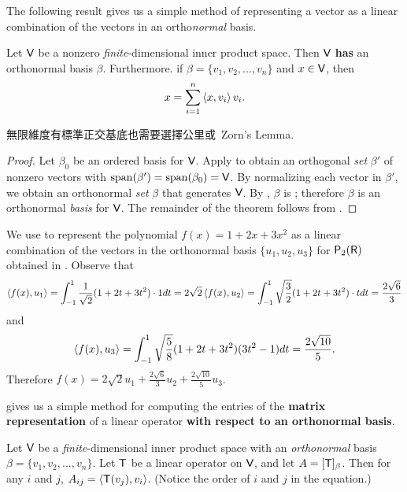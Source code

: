 The following result gives us a simple method of representing a vector as a linear combination of the vectors in an ortho\emph{normal} basis.

\begin{theorem} \label{thm 6.5}
Let \(\textsf{V}\) be a nonzero \emph{finite}-dimensional inner product space.
Then \(\textsf{V}\) \textbf{has} an orthonormal basis \(\beta\).
Furthermore. if \(\beta = \{ v_1, v_2, ..., v_n \}\) and \(x \in \textsf{V}\), then
\[
    x = \sum_{i = 1}^n \left< x, v_i \right> v_i.
\]
\end{theorem}

\begin{note}
無限維度有標準正交基底也需要選擇公里或\ Zorn's Lemma.
\end{note}

\begin{proof}
Let \(\beta_0\) be an ordered basis for \(\textsf{V}\).
Apply  to obtain an orthogonal \emph{set} \(\beta'\) of nonzero vectors with \(\operatorname{span}(\beta') = \operatorname{span}(\beta_0) = \textsf{V}\).
By normalizing each vector in \(\beta'\), we obtain an orthonormal \emph{set} \(\beta\) that generates \(\textsf{V}\).
By , \(\beta\) is \LID{}; therefore \(\beta\) is an orthonormal \emph{basis} for \(\textsf{V}\).
The remainder of the theorem follows from .
\end{proof}

\begin{example} \label{example 6.2.6}
We use  to represent the polynomial \(f(x) = 1 + 2x + 3x^2\) as a linear combination of the vectors in the orthonormal basis \(\{ u_1, u_2, u_3 \}\) for \(\textsf{P}_2(\textsf{R})\) obtained in .
Observe that
\[
    \left< f(x), u_1 \right> = \int_{-1}^{1} \frac{1}{\sqrt{2}} (1+2 t+3 t^2) \cdot 1 dt = 2 \sqrt{2} \\
    \left< f(x), u_2 \right> = \int_{-1}^{1} \sqrt{\frac{3}{2}} (1+2 t+3 t^2) \cdot t dt = \frac{2 \sqrt{6}}{3}
\]
and
\[
    \left< f(x), u_3 \right> = \int_{-1}^{1} \sqrt{\frac{5}{8}} (1 + 2t + 3t^2) (3 t^2 - 1) d t = \frac{2 \sqrt{10}}{5}.
\]
Therefore \(f(x) = 2 \sqrt{2} u_1 + \frac{2 \sqrt{6}}{3} u_2 + \frac{2 \sqrt{10}}{5} u_3\).
\end{example}

 gives us a simple method for computing the entries of the \textbf{matrix representation} of a linear operator \textbf{with respect to an orthonormal basis}.

\begin{corollary} \label{corollary 6.5.1}
Let \(\textsf{V}\) be a \emph{finite}-dimensional inner product space with an \emph{orthonormal} basis \(\beta = \{ v_1, v_2, ..., v_n \}\).
Let \(\textsf{T}\) be a linear operator on \(\textsf{V}\), and let \(A = [\textsf{T}]_{\beta}\).
Then for any \(i\) and \(j\), \(A_{ij} = \left< \textsf{T}(v_j), v_i \right>\).
(Notice the order of \(i\) and \(j\) in the equation.)
\end{corollary}

